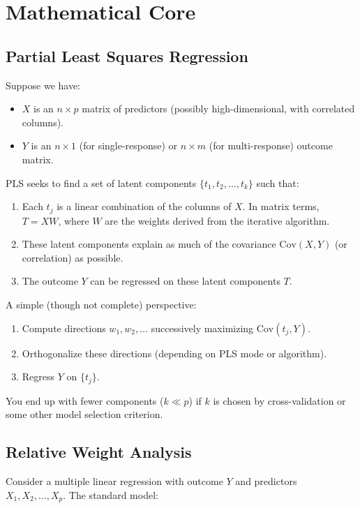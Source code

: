 \appendix
\section{Mathematical Core}

\subsection{Partial Least Squares Regression}

Suppose we have:
\begin{itemize}
    \item $X$ is an $n \times p$ matrix of predictors (possibly high-dimensional, with correlated columns).
    \item $Y$ is an $n \times 1$ (for single-response) or $n \times m$ (for multi-response) outcome matrix.
\end{itemize}

PLS seeks to find a set of latent components $\{t_1, t_2, \ldots, t_k\}$ such that:
\begin{enumerate}
    \item Each $t_j$ is a linear combination of the columns of $X$. In matrix terms, $T = XW$, where $W$ are the weights derived from the iterative algorithm.
    \item These latent components explain as much of the covariance $\mathrm{Cov}(X, Y)$ (or correlation) as possible.
    \item The outcome $Y$ can be regressed on these latent components $T$.
\end{enumerate}

A simple (though not complete) perspective:
\begin{enumerate}
    \item Compute directions $w_1, w_2, \ldots$ successively maximizing $\mathrm{Cov}(t_j, Y)$.
    \item Orthogonalize these directions (depending on PLS mode or algorithm).
    \item Regress $Y$ on $\{t_j\}$.
\end{enumerate}

You end up with fewer components ($k\ll p$) if $k$ is chosen by cross-validation or some other model selection criterion.

\subsection{Relative Weight Analysis}

Consider a multiple linear regression with outcome $Y$ and predictors $X_1, X_2, \ldots, X_p$. The standard model:

